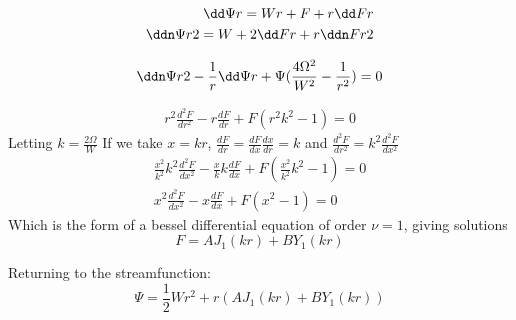 \documentclass{X:/Documents/Coding/Latex/myreport}
\begin{document}
\begin{align*}
    \dd\Psi r = Wr + F + r\dd F r\\
    \ddn\Psi r2 = W + 2\dd F r + r\ddn Fr 2
\end{align*}

\[ \ddn\Psi r2 - \frac1r \dd\Psi r + \Psi(\frac{4\Omega^2}{W^2} - \frac1{r^2}) = 0 \]

\begin{align*}
    r^2 \frac{d^2F}{dr^2} - r \frac{dF}{dr} + F(r^2k^2 - 1) = 0 
\end{align*}
Letting $k = \frac{2\Omega}{W}$
If we take $x = kr$, $\frac{dF}{dr} = \frac{dF}{dx} \frac{dx}{dr} = k$ and $\frac{d^2F}{dr^2} = k^2 \frac{d^2F}{dx^2}$
\begin{align*}
    \frac{x^2}{k^2}k^2 \frac{d^2F}{dx^2} - \frac{x}{k}k \frac{dF}{dx} + F(\frac{x^2}{k^2}k^2 - 1) = 0\\
    x^2 \frac{d^2F}{dx^2} - x \frac{dF}{dx} + F(x^2 - 1) = 0
\end{align*}
Which is the form of a bessel differential equation of order $\nu =1$, giving solutions
\[F = AJ_1(kr) + BY_1(kr)  \]



Returning to the streamfunction:
\[\Psi = \frac12 W r^2 + r\left(AJ_1(kr) + BY_1(kr)\right)\]
\end{document}
